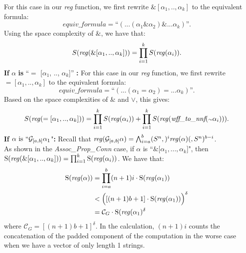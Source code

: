 \documentclass[runningheads]{llncs}
\begin{document}
For this case in our \emph{reg} function, we first rewrite $\& [\alpha_{1}, .., \alpha_{k}]$ to the equivalent formula:
    \[ 
    \textit{equiv\_formula} = \text{``}( ... (\alpha_{1} \& \alpha_{2}) \& ... \alpha_{k})\text{''}.
    \]
Using the space complexity of $\&$, we have that:
    \[
    S(\text{\emph{reg}}(\& [\alpha_{1}, .., \alpha_{k}])) = 
    \prod_{i=1}^{k} S(\text{\emph{reg}}(\alpha_{i})).
    \]
\textbf{If} $\alpha$ \textbf{is} ``$=$ [$\alpha_{1}$, .., $\alpha_{k}$]'' \textbf{:}
For this case in our \emph{reg} function, we first rewrite $= [\alpha_{1}, .., \alpha_{k}]$ to the equivalent formula:
    \[ 
    \textit{equiv\_formula} = \text{``}( ... (\alpha_{1} = \alpha_{2}) = ... \alpha_{k})\text{''}.
    \]
Based on the space complexities of $\&$ and $\lor$, this gives:
    \[
    S(\text{\emph{reg}}(= [\alpha_{1}, .., \alpha_{k}])) = 
    \prod_{i=1}^{k} S(\text{\emph{reg}}(\alpha_{i}))
    + \prod_{i=1}^{k} S(\text{\emph{reg}}(\textit{wff\_to\_nnf}(\scriptstyle{\sim}\textstyle \alpha_{i}))).
    \]
 \textbf{If} $\alpha \text{ is } ``\mathcal{G}_{[a,b]} \alpha_{1}$"\textbf{:}
 Recall that $\text{\emph{reg}}(\mathcal{G}_{[a,b]} \alpha) = \bigwedge_{i=a}^{b} (S^n,)^i \text{\emph{reg}}(\alpha) (,S^n)^{b-i}$.\\
 As shown in the \textit{Assoc\_Prop\_Conn} case, if $\alpha$ is ``$\&[\alpha_1, ... ,\alpha_k$]", then \\
 $\text{S(\emph{reg}}(\& [\alpha_{1}, .., \alpha_{k}])) = 
    \prod_{i=1}^{k} \text{S(\emph{reg}}(\alpha_{i}))$. We have that:
 \begin{align*}
     \text{S(\emph{reg}}(\alpha)) &= \prod_{i=a}^{b} (n+1)i \cdot \text{S(\emph{reg}}(\alpha_{1}))\\
     &< \Bigl([(n+1)b+1] \cdot \text{S(\emph{reg}}(\alpha_1))\Bigl)^\delta \\
     &= \mathcal{C}_{G} \cdot \text{S(\emph{reg}}(\alpha_1)^\delta 
 \end{align*}
 where $\mathcal{C}_{G} = [(n+1)b+1]^{\delta}$.
 In the calculation, $(n+1)i$ counts the concatenation of the padded component of the computation in the worse case when we have a vector of only length 1 strings. \\
\end{document}
